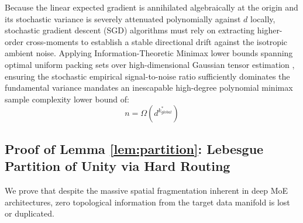 \documentclass{article}
\newcommand{\1}{\mathbb{I}}
\begin{document}
Because the linear expected gradient is annihilated algebraically at the origin and its stochastic variance is severely attenuated polynomially against $d$ locally, stochastic gradient descent (SGD) algorithms must rely on extracting higher-order cross-moments to establish a stable directional drift against the isotropic ambient noise. Applying Information-Theoretic Minimax lower bounds spanning optimal uniform packing sets over high-dimensional Gaussian tensor estimation \citep{benarous2021online}, ensuring the stochastic empirical signal-to-noise ratio sufficiently dominates the fundamental variance mandates an inescapable high-degree polynomial minimax sample complexity lower bound of:
\begin{equation}
    n = \Omega(d^{k_{global}^*})
\end{equation}

\subsection{Proof of Lemma \ref{lem:partition}: Lebesgue Partition of Unity via Hard Routing}
\label{app:lemma_partition}

We prove that despite the massive spatial fragmentation inherent in deep MoE architectures, zero topological information from the target data manifold is lost or duplicated.
\end{document}
